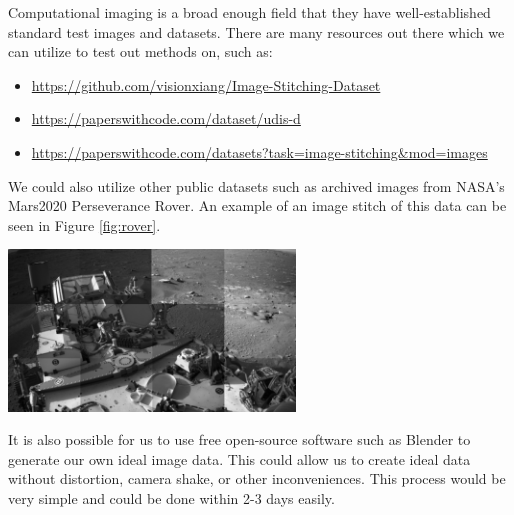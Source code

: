 \documentclass[11pt, letterpaper, notitlepage]{article}
\newenvironment{Figure}
  {\par\medskip\noindent\minipage{\linewidth}}
  {\endminipage\par\medskip}
\begin{document}
\begin{multicols}{2}
Computational imaging is a broad enough field that they have well-established standard test images and datasets. There are many resources out there which we can utilize to test out methods on, such as:

\begin{itemize}
  \item \url{https://github.com/visionxiang/Image-Stitching-Dataset}
  \item \url{https://paperswithcode.com/dataset/udis-d}
  \item \url{https://paperswithcode.com/datasets?task=image-stitching&mod=images}
\end{itemize}

We could also utilize other public datasets such as archived images from NASA's Mars2020 Perseverance Rover. An example of an image stitch of this data can be seen in Figure \ref{fig:rover}.

\begin{Figure}
  \centering  
  \includegraphics[width=3in]{images/stitch.png}
  \label{fig:rover}
\end{Figure}

It is also possible for us to use free open-source software such as Blender to generate our own ideal image data. This could allow us to create ideal data without distortion, camera shake, or other inconveniences. This process would be very simple and could be done within 2-3 days easily.


\end{multicols}
\end{document}
